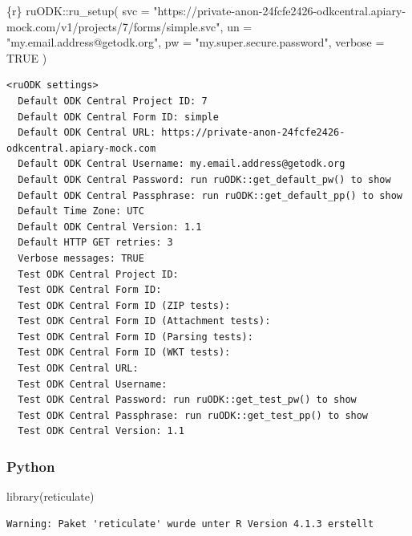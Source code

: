 \documentclass[
  letterpaper,
  DIV=11,
  numbers=noendperiod,
  oneside]{scrreprt}
\newenvironment{Shaded}{\begin{snugshade}}{\end{snugshade}}
\newcommand{\AttributeTok}[1]{\textcolor[rgb]{0.40,0.45,0.13}{#1}}
\newcommand{\ConstantTok}[1]{\textcolor[rgb]{0.56,0.35,0.01}{#1}}
\newcommand{\FunctionTok}[1]{\textcolor[rgb]{0.28,0.35,0.67}{#1}}
\newcommand{\InformationTok}[1]{\textcolor[rgb]{0.37,0.37,0.37}{#1}}
\newcommand{\NormalTok}[1]{\textcolor[rgb]{0.00,0.23,0.31}{#1}}
\newcommand{\SpecialCharTok}[1]{\textcolor[rgb]{0.37,0.37,0.37}{#1}}
\newcommand{\StringTok}[1]{\textcolor[rgb]{0.13,0.47,0.30}{#1}}
\begin{document}
\begin{Shaded}
\begin{Highlighting}[]
\InformationTok{\textasciigrave{}\textasciigrave{}\textasciigrave{}\{r\}}
\NormalTok{ruODK}\SpecialCharTok{::}\FunctionTok{ru\_setup}\NormalTok{(}
  \AttributeTok{svc =} \StringTok{"https://private{-}anon{-}24fcfe2426{-}odkcentral.apiary{-}mock.com/v1/projects/7/forms/simple.svc"}\NormalTok{,}
  \AttributeTok{un =} \StringTok{"my.email.address@getodk.org"}\NormalTok{,}
  \AttributeTok{pw =} \StringTok{"my.super.secure.password"}\NormalTok{,}
  \AttributeTok{verbose =} \ConstantTok{TRUE}
\NormalTok{)}
\InformationTok{\textasciigrave{}\textasciigrave{}\textasciigrave{}}
\end{Highlighting}
\end{Shaded}

\begin{verbatim}
<ruODK settings>
  Default ODK Central Project ID: 7 
  Default ODK Central Form ID: simple 
  Default ODK Central URL: https://private-anon-24fcfe2426-odkcentral.apiary-mock.com 
  Default ODK Central Username: my.email.address@getodk.org 
  Default ODK Central Password: run ruODK::get_default_pw() to show 
  Default ODK Central Passphrase: run ruODK::get_default_pp() to show 
  Default Time Zone: UTC 
  Default ODK Central Version: 1.1 
  Default HTTP GET retries: 3 
  Verbose messages: TRUE 
  Test ODK Central Project ID:  
  Test ODK Central Form ID:  
  Test ODK Central Form ID (ZIP tests):  
  Test ODK Central Form ID (Attachment tests):  
  Test ODK Central Form ID (Parsing tests):  
  Test ODK Central Form ID (WKT tests):  
  Test ODK Central URL:  
  Test ODK Central Username:  
  Test ODK Central Password: run ruODK::get_test_pw() to show 
  Test ODK Central Passphrase: run ruODK::get_test_pp() to show 
  Test ODK Central Version: 1.1 
\end{verbatim}

\hypertarget{python-7}{%
\subsubsection{Python}\label{python-7}}

\begin{Shaded}
\begin{Highlighting}[]
\FunctionTok{library}\NormalTok{(reticulate)}
\end{Highlighting}
\end{Shaded}

\begin{verbatim}
Warning: Paket 'reticulate' wurde unter R Version 4.1.3 erstellt
\end{verbatim}
\end{document}
